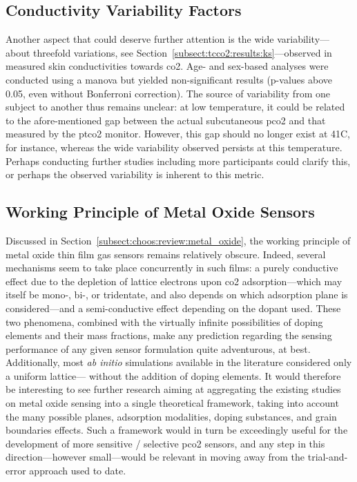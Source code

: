 \subsection{Conductivity Variability Factors}

Another aspect that could deserve further attention is the wide variability---\ie{} about threefold variations, see Section~\ref{subsect:tcco2:results:ks}---observed in measured skin conductivities towards \gls{co2}. Age- and sex-based analyses were conducted using a \gls{manova} but yielded non-significant results (p-values above 0.05, even without Bonferroni correction). The source of variability from one subject to another thus remains unclear: at low temperature, it could be related to the afore-mentioned gap between the actual subcutaneous \gls{pco2} and that measured by the \gls{ptco2} monitor. However, this gap should no longer exist at 41{\degree}C, for instance, whereas the wide variability observed persists at this temperature. Perhaps conducting further studies including more participants could clarify this, or perhaps the observed variability is inherent to this metric.

\subsection{Working Principle of Metal Oxide Sensors}

Discussed in Section~\ref{subsect:choos:review:metal_oxide}, the working principle of metal oxide thin film gas sensors remains relatively obscure. Indeed, several mechanisms seem to take place concurrently in such films: a purely conductive effect due to the depletion of lattice electrons upon \gls{co2} adsorption---which may itself be mono-, bi-, or tridentate\cite{usseinov2019}, and also depends on which adsorption plane is considered\cite{tang2013}---and a semi-conductive effect depending on the dopant used\cite{niu2004, sato2007, ra2010}. These two phenomena, combined with the virtually infinite possibilities of doping elements and their mass fractions, make any prediction regarding the sensing performance of any given sensor formulation quite adventurous, at best. Additionally, most \textit{ab initio} simulations available in the literature considered only a uniform lattice---\ie{} without the addition of doping elements. It would therefore be interesting to see further research aiming at aggregating the existing studies on metal oxide sensing into a single theoretical framework, taking into account the many possible planes, adsorption modalities, doping substances, and grain boundaries effects. Such a framework would in turn be exceedingly useful for the development of more sensitive / selective \gls{pco2} sensors, and any step in this direction---however small---would be relevant in moving away from the trial-and-error approach used to date.

